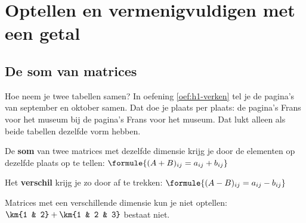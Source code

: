 
\begin{oefeningen}
\end{oefeningen}

\section{Optellen en vermenigvuldigen met een getal}

\subsection{De som van matrices}

Hoe neem je twee tabellen samen? In oefening \ref{oef:h1-verken} tel je de pagina's van september en oktober samen. Dat doe je plaats per plaats: de pagina's Frans voor het museum bij de pagina's Frans voor het museum. Dat lukt alleen als beide tabellen dezelfde vorm hebben.

\begin{theorie}
De \textbf{\textcolor{accent}{som}} van twee matrices met dezelfde dimensie krijg je door de elementen op dezelfde plaats op te tellen: \quad $\formule{(A + B)_{ij} = a_{ij} + b_{ij}}$

\vspace{1mm}
Het \textbf{\textcolor{accent}{verschil}} krijg je zo door af te trekken: \quad $\formule{(A - B)_{ij} = a_{ij} - b_{ij}}$
\end{theorie}

Matrices met een verschillende dimensie kun je niet optellen: $\km{1 & 2} + \km{1 & 2 & 3}$ bestaat niet.

